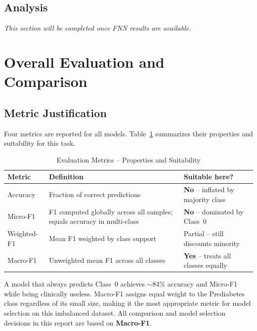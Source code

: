 \documentclass[12pt,a4paper]{article}
\begin{document}
\subsection{Analysis}

\textit{This section will be completed once FNN results are available.}

\section{Overall Evaluation and Comparison}

\subsection{Metric Justification}

Four metrics are reported for all models. Table~\ref{tab:metric_justification} summarizes their properties and suitability for this task.

\begin{table}[H]
    \centering
    \caption{Evaluation Metrics -- Properties and Suitability}
    \label{tab:metric_justification}
    \begin{tabular}{lp{5.5cm}l}
        \toprule
        \textbf{Metric} & \textbf{Definition} & \textbf{Suitable here?} \\
        \midrule
        Accuracy    & Fraction of correct predictions & \textbf{No} -- inflated by majority class \\
        Micro-F1    & F1 computed globally across all samples; equals accuracy in multi-class & \textbf{No} -- dominated by Class~0 \\
        Weighted-F1 & Mean F1 weighted by class support & Partial -- still discounts minority \\
        Macro-F1    & Unweighted mean F1 across all classes & \textbf{Yes} -- treats all classes equally \\
        \bottomrule
    \end{tabular}
\end{table}

A model that always predicts Class~0 achieves $\sim$84\% accuracy and Micro-F1 while being clinically useless. Macro-F1 assigns equal weight to the Prediabetes class regardless of its small size, making it the most appropriate metric for model selection on this imbalanced dataset. All comparison and model selection decisions in this report are based on \textbf{Macro-F1}.
\end{document}
